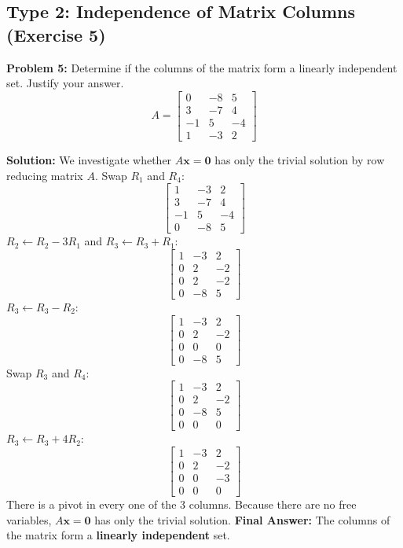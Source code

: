 \documentclass[11pt]{article}
\begin{document}
\subsection{Type 2: Independence of Matrix Columns (Exercise 5)}

\textbf{Problem 5:} Determine if the columns of the matrix form a linearly independent set. Justify your answer.
\[
A = \begin{bmatrix}
0 & -8 & 5 \\
3 & -7 & 4 \\
-1 & 5 & -4 \\
1 & -3 & 2
\end{bmatrix}
\]

\textbf{Solution:}
We investigate whether $A\mathbf{x} = \mathbf{0}$ has only the trivial solution by row reducing matrix $A$.
Swap $R_1$ and $R_4$:
\[
\begin{bmatrix}
1 & -3 & 2 \\
3 & -7 & 4 \\
-1 & 5 & -4 \\
0 & -8 & 5
\end{bmatrix}
\]
$R_2 \leftarrow R_2 - 3R_1$ \quad and \quad $R_3 \leftarrow R_3 + R_1$:
\[
\begin{bmatrix}
1 & -3 & 2 \\
0 & 2 & -2 \\
0 & 2 & -2 \\
0 & -8 & 5
\end{bmatrix}
\]
$R_3 \leftarrow R_3 - R_2$:
\[
\begin{bmatrix}
1 & -3 & 2 \\
0 & 2 & -2 \\
0 & 0 & 0 \\
0 & -8 & 5
\end{bmatrix}
\]
Swap $R_3$ and $R_4$:
\[
\begin{bmatrix}
1 & -3 & 2 \\
0 & 2 & -2 \\
0 & -8 & 5 \\
0 & 0 & 0
\end{bmatrix}
\]
$R_3 \leftarrow R_3 + 4R_2$:
\[
\begin{bmatrix}
1 & -3 & 2 \\
0 & 2 & -2 \\
0 & 0 & -3 \\
0 & 0 & 0
\end{bmatrix}
\]
There is a pivot in every one of the 3 columns. Because there are no free variables, $A\mathbf{x} = \mathbf{0}$ has only the trivial solution.
\textbf{Final Answer:} The columns of the matrix form a \textbf{linearly independent} set.
\end{document}

